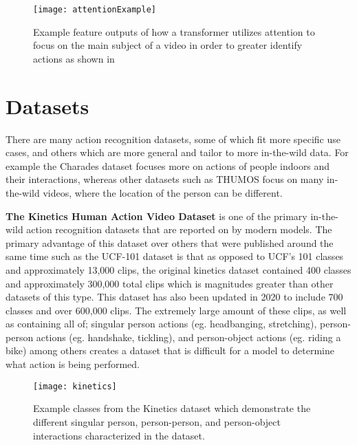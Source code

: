 \begin{figure}[ht]
	\texttt{[image: attentionExample]}
	\centering
	\caption{Example feature outputs of how a transformer utilizes attention to focus on the main subject of a video in order to greater identify actions as shown in \cite{transformer_og}}
	\label{fig:attentionExample}
\end{figure}

\section{Datasets}
\label{sec:datasets}

There are many action recognition datasets, some of which fit more specific use cases, and others which are more general and tailor to more in-the-wild data. For example the Charades dataset \cite{charades} focuses more on actions of people indoors and their interactions, whereas other datasets such as THUMOS \cite{THUMOS15} focus on many in-the-wild videos, where the location of the person can be different.

\textbf{The Kinetics Human Action Video Dataset} \cite{kinetics} is one of the primary in-the-wild action recognition datasets that are reported on by modern models. The primary advantage of this dataset over others that were published around the same time such as the UCF-101 dataset \cite{ucf101} is that as opposed to UCF's 101 classes and approximately 13,000 clips, the original kinetics dataset contained 400 classes and approximately 300,000 total clips which is magnitudes greater than other datasets of this type. This dataset has also been updated in 2020 to include 700 classes and over 600,000 clips. The extremely large amount of these clips, as well as containing all of; singular person actions (eg. headbanging, stretching), person-person actions (eg. handshake, tickling), and person-object actions (eg. riding a bike) among others creates a dataset that is difficult for a model to determine what action is being performed.

\begin{figure}[ht]
	\texttt{[image: kinetics]}
	\centering
	\caption{Example classes from the Kinetics dataset \cite{kinetics} which demonstrate the different singular person, person-person, and person-object interactions characterized in the dataset.}
	\label{fig:kinetics}
\end{figure}

